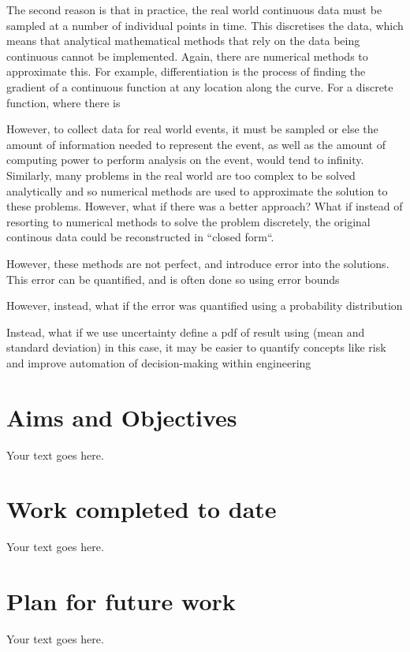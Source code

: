 \documentclass[12pt]{article}
\begin{document}
    The second reason is that in practice, the real world continuous data must be sampled at a number of individual points in time.
    This discretises the data, which means that analytical mathematical methods that rely on the data being continuous cannot be implemented.
    Again, there are numerical methods to approximate this.
    For example, differentiation is the process of finding the gradient of a continuous function at any location along the curve.
    For a discrete function, where there is




    However, to collect data for real world events, it must be sampled or else the amount of information needed to represent the event, as well as the amount of computing power to perform analysis on the event, would tend to infinity.
    Similarly, many problems in the real world are too complex to be solved analytically and so numerical methods are used to approximate the solution to these problems.
    However, what if there was a better approach?
    What if instead of resorting to numerical methods to solve the problem discretely, the original continous data could be reconstructed in ``closed form``.

        However, these methods are not perfect, and introduce error into the solutions.
        This error can be quantified, and is often done so using error bounds


    However, instead, what if the error was quantified using a probability distribution

    Instead, what if we use uncertainty define a pdf of result using (mean and standard deviation)
    in this case, it may be easier to quantify concepts like risk and improve automation of decision-making within engineering
    \subsection{}

    \section{Aims and Objectives}
    Your text goes here.

    \section{Work completed to date}
    Your text goes here. \cite{q-candela}
    \section{Plan for future work}
    Your text goes here.
\end{document}
